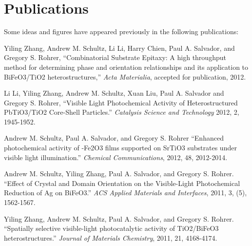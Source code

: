 \documentclass[12pt,%
              twoside,
               letterpaper]{uiothesis}
\begin{document}
     
%    
%     
  \tableofcontents
%    
%     
   \listoffigures
%    
%     
    \listoftables
     


\chapter*{Publications}

Some ideas and figures have appeared previously in the following publications:



\begin{items}

\item Yiling Zhang, Andrew M. Schultz, Li Li, Harry Chien, Paul A. Salvador, and Gregory
S. Rohrer, ``Combinatorial Substrate Epitaxy: A high throughput method for determining
phase and orientation relationships and its application to BiFeO3/TiO2
heterostructures,'' \emph{Acta Materialia}, accepted for publication, 2012.

\item Li Li, Yiling Zhang, Andrew M. Schultz, Xuan Liu, Paul A. Salvador and Gregory S.
Rohrer, ``Visible Light Photochemical Activity of Heterostructured PbTiO3/TiO2
Core-Shell Particles.'' \emph{Catalysis Science and Technology} 2012, 2, 1945-1952.

\item Andrew M. Schultz, Paul A. Salvador, and Gregory S. Rohrer ``Enhanced photochemical
activity of \textalpha-Fe2O3 films supported on SrTiO3 substrates under visible
light illumination.'' \emph{Chemical Communications}, 2012, 48, 2012-2014.

\item Andrew M. Schultz, Yiling Zhang, Paul A. Salvador, and Gregory S. Rohrer. ``Effect
of Crystal and Domain Orientation on the Visible-Light Photochemical Reduction of Ag on
BiFeO3.'' \emph{ACS Applied Materials and Interfaces}, 2011, 3, (5), 1562-1567.


\item Yiling Zhang, Andrew M. Schultz, Paul A. Salvador, and Gregory S. Rohrer.
``Spatially selective visible-light photocatalytic activity of TiO2/BiFeO3
heterostructures.'' \emph{Journal of Materials Chemistry}, 2011, 21, 4168-4174.

\end{items}
\end{document}
